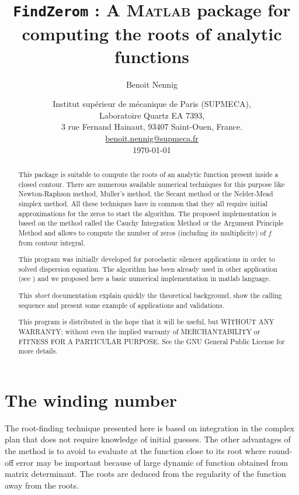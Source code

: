 \documentclass[a4paper,10pt]{article}
\title{\texttt{FindZerom} : A \textsc{Matlab} package for computing the roots of analytic functions}
\author{Benoit Nennig}
\date{Institut sup\'erieur de m\'ecanique de Paris (SUPMECA),\\ Laboratoire Quartz EA 7393,\\
3 rue Fernand Hainaut, 93407 Saint-Ouen, France.\\[0.5cm]
\url{benoit.nennig@supmeca.fr}\\[0.5cm]
\today}
\begin{document}
\maketitle
\begin{abstract}
This package is suitable to compute the roots of an analytic function present inside a closed contour. There are numerous available numerical techniques for this purpose like Newton-Raphson method, Muller's method, the Secant method or the Nelder-Mead simplex method. All these techniques have in common that they all require initial approximations for the zeros to start the algorithm. The proposed implementation is based on the method called the Cauchy Integration Method  or the Argument Principle Method and allows to compute the number of zeros (including its multiplicity) of $f$ from contour integral.

This program was initially developed for poroelastic silencer applications\cite{Nennig:2010} in order to solved dispersion equation. The algorithm has been already used in other application (see \cite{Delves:1967,Chen:2000,Kravanja:2000}) and we proposed here a basic numerical implementation in matlab language.

This \emph{short} documentation explain quickly the theoretical background, show the calling sequence and present some example of applications and validations.

This program is distributed in the hope that it will be useful, but WITHOUT ANY WARRANTY; without even the implied warranty of    MERCHANTABILITY or FITNESS FOR A PARTICULAR PURPOSE.  See the GNU General Public License for more details.

\end{abstract}


\section{The winding number}
The root-finding technique presented here is based on integration in the complex plan that does not require knowledge of initial guesses. 
The other advantages of the method is to avoid to evaluate at the function close to its root where round-off error may be important because of large dynamic of function obtained from matrix determinant. The roots are deduced from the regularity of the function away from the roots.
\end{document}
